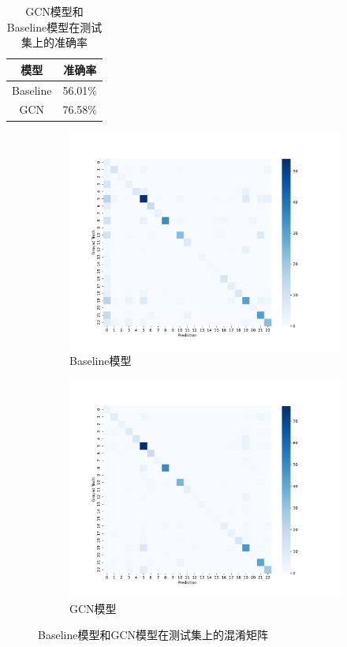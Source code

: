 \begin{table}[htbp]
    \centering
    \caption{GCN模型和Baseline模型在测试集上的准确率}
    \begin{tabular}{cc}
        \toprule
        模型 & 准确率 \\
        \midrule
        Baseline & 56.01\% \\
        GCN & 76.58\% \\
        \bottomrule
    \end{tabular}
    \label{tab:gcn_acc}
\end{table}

\begin{figure}
    \centering
    \begin{subfigure}{0.48\textwidth}
        \centering
        \includegraphics[width=\textwidth]{confusion_matrix_baseline.pdf}
        \caption{Baseline模型}
    \end{subfigure}
    \begin{subfigure}{0.48\textwidth}
        \centering
        \includegraphics[width=\textwidth]{confusion_matrix_gnn.pdf}
        \caption{GCN模型}
    \end{subfigure}
    \caption{Baseline模型和GCN模型在测试集上的混淆矩阵}
    \label{tab:gcn_confusion}
\end{figure}

